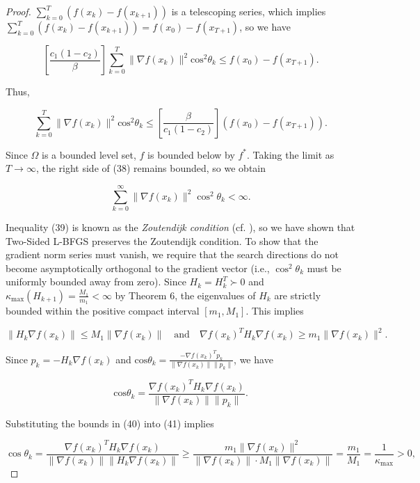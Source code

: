 \documentclass[twoside,11pt]{article}
\begin{document}
\begin{proof}
\noindent
$\sum_{k=0}^{T}(f(x_k) - f(x_{k+1}))$ is a telescoping series, which implies $\sum_{k=0}^{T}(f(x_k) - f(x_{k+1})) = f(x_0) - f(x_{T+1})$, so we have

\[
[\frac{c_1(1-c_2)}{\beta}]\sum_{k=0}^{T}\|\nabla f(x_k)\|^2 \text{cos}^2\theta_k \leq f(x_0) - f(x_{T+1}).
\]

\noindent
Thus, 

\begin{equation}
\sum_{k=0}^{T}\|\nabla f(x_k)\|^2 \text{cos}^2\theta_k \leq [\frac{\beta}{c_1(1-c_2)}](f(x_0) - f(x_{T+1})).
\end{equation}

\noindent
Since $\Omega$ is a bounded level set, $f$ is bounded below by $f^*$. Taking the limit as $T \to \infty$, the right side of (38) remains bounded, so we obtain

\begin{equation}
\sum_{k=0}^{\infty} \|\nabla f(x_k)\|^2 \cos^2\theta_k < \infty. 
\end{equation}

\noindent
Inequality (39) is known as the \textit{Zoutendijk condition} (cf. \cite{Zou60}), so we have shown that Two-Sided L-BFGS preserves the Zoutendijk condition. To show that the gradient norm series must vanish, we require that the search directions do not become asymptotically orthogonal to the gradient vector (i.e., $\cos^2\theta_k$ must be uniformly bounded away from zero). Since $H_k = H_k^T \succ 0$ and $\kappa_{\max}(H_{k+1}) = \frac{M_1}{m_1} < \infty$ by Theorem 6, the eigenvalues of $H_k$ are strictly bounded within the positive compact interval $[m_1, M_1]$. This implies

\begin{equation}
\|H_k \nabla f(x_k)\| \leq M_1 \|\nabla f(x_k)\| \quad \text{and} \quad \nabla f(x_k)^T H_k \nabla f(x_k) \geq m_1 \|\nabla f(x_k)\|^2.
\end{equation}

\noindent
Since $p_k = -H_k \nabla f(x_k)$ and $\text{cos}\theta_k = \frac{-\nabla f(x_k)^T p_k}{\|\nabla f(x_k)\| \|p_k\|}$, we have

\begin{equation}
\text{cos}\theta_k = \frac{\nabla f(x_k)^T H_k \nabla f(x_k)}{\|\nabla f(x_k)\| \|p_k\|}.
\end{equation}

\noindent
Substituting the bounds in (40) into (41) implies

\begin{equation}
\cos\theta_k = \frac{\nabla f(x_k)^T H_k \nabla f(x_k)}{\|\nabla f(x_k)\| \|H_k \nabla f(x_k)\|} \geq \frac{m_1 \|\nabla f(x_k)\|^2}{\|\nabla f(x_k)\| \cdot M_1 \|\nabla f(x_k)\|} = \frac{m_1}{M_1} = \frac{1}{\kappa_{\max}} > 0,
\end{equation}


\end{proof}
\end{document}
